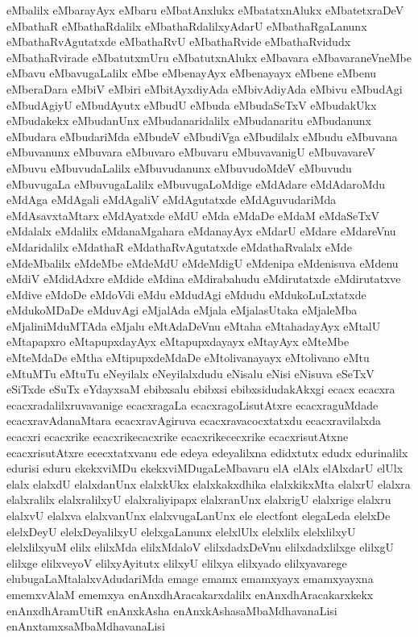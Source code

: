 {eMbalilx
eMbarayAyx
eMbaru
eMbatAnxlukx
eMbatatxnAlukx
eMbatetxraDeV
eMbathaR
eMbathaRdalilx
eMbathaRdalilxyAdarU
eMbathaRgaLanunx
eMbathaRvAgutatxde
eMbathaRvU
eMbathaRvide
eMbathaRvidudx
eMbathaRvirade
eMbatutxmUru
eMbatutxnAlukx
eMbavara
eMbavaraneVneMbe
eMbavu
eMbavugaLalilx
eMbe
eMbenayAyx
eMbenayayx
eMbene
eMbenu
eMberaDara
eMbiV
eMbiri
eMbitAyxdiyAda
eMbivAdiyAda
eMbivu
eMbudAgi
eMbudAgiyU
eMbudAyutx
eMbudU
eMbuda
eMbudaSeTxV
eMbudakUkx
eMbudakekx
eMbudanUnx
eMbudanaridalilx
eMbudanaritu
eMbudanunx
eMbudara
eMbudariMda
eMbudeV
eMbudiVga
eMbudilalx
eMbudu
eMbuvana
eMbuvanunx
eMbuvara
eMbuvaro
eMbuvaru
eMbuvavanigU
eMbuvavareV
eMbuvu
eMbuvudaLalilx
eMbuvudanunx
eMbuvudoMdeV
eMbuvudu
eMbuvugaLa
eMbuvugaLalilx
eMbuvugaLoMdige
eMdAdare
eMdAdaroMdu
eMdAga
eMdAgali
eMdAgaliV
eMdAgutatxde
eMdAguvudariMda
eMdAsavxtaMtarx
eMdAyatxde
eMdU
eMda
eMdaDe
eMdaM
eMdaSeTxV
eMdalalx
eMdalilx
eMdanaMgahara
eMdanayAyx
eMdarU
eMdare
eMdareVnu
eMdaridalilx
eMdathaR
eMdathaRvAgutatxde
eMdathaRvalalx
eMde
eMdeMbalilx
eMdeMbe
eMdeMdU
eMdeMdigU
eMdenipa
eMdenisuva
eMdenu
eMdiV
eMdidAdxre
eMdide
eMdina
eMdirabahudu
eMdirutatxde
eMdirutatxve
eMdive
eMdoDe
eMdoVdi
eMdu
eMdudAgi
eMdudu
eMdukoLuLxtatxde
eMdukoMDaDe
eMduvAgi
eMjalAda
eMjala
eMjalasUtaka
eMjaleMba
eMjaliniMduMTAda
eMjalu
eMtAdaDeVnu
eMtaha
eMtahadayAyx
eMtalU
eMtapapxro
eMtapupxdayAyx
eMtapupxdayayx
eMtayAyx
eMteMbe
eMteMdaDe
eMtha
eMtipupxdeMdaDe
eMtolivanayayx
eMtolivano
eMtu
eMtuMTu
eMtuTu
eNeyilalx
eNeyilalxdudu
eNisalu
eNisi
eNisuva
eSeTxV
eSiTxde
eSuTx
eYdayxsaM
ebibxsalu
ebibxsi
ebibxsidudakAkxgi
ecacx
ecacxra
ecacxradalilxruvavanige
ecacxragaLa
ecacxragoLisutAtxre
ecacxraguMdade
ecacxravAdanaMtara
ecacxravAgiruva
ecacxravacocxtatxdu
ecacxravilalxda
ecacxri
ecacxrike
ecacxrikecacxrike
ecacxrikececxrike
ecacxrisutAtxne
ecacxrisutAtxre
ececxtatxvanu
ede
edeya
edeyalilxna
edidxtutx
edudx
edurinalilx
edurisi
eduru
ekekxviMDu
ekekxviMDugaLeMbavaru
elA
elAlx
elAlxdarU
elUlx
elalx
elalxdU
elalxdanUnx
elalxkUkx
elalxkakxdhika
elalxkikxMta
elalxrU
elalxra
elalxralilx
elalxralilxyU
elalxraliyipapx
elalxranUnx
elalxrigU
elalxrige
elalxru
elalxvU
elalxva
elalxvanUnx
elalxvugaLanUnx
ele
electfont
elegaLeda
elelxDe
elelxDeyU
elelxDeyalilxyU
elelxgaLanunx
elelxlUlx
elelxlilx
elelxlilxyU
elelxlilxyuM
elilx
elilxMda
elilxMdaloV
elilxdadxDeVnu
elilxdadxlilxge
elilxgU
elilxge
elilxveyoV
elilxyAyitutx
elilxyU
elilxya
elilxyado
elilxyavarege
elubugaLaMtalalxvAdudariMda
emage
emamx
emamxyayx
emamxyayxna
ememxvAlaM
ememxya
enAnxdhAracakarxdalilx
enAnxdhAracakarxkekx
enAnxdhAramUtiR
enAnxkAsha
enAnxkAshasaMbaMdhavanaLisi
enAnxtamxsaMbaMdhavanaLisi
}
